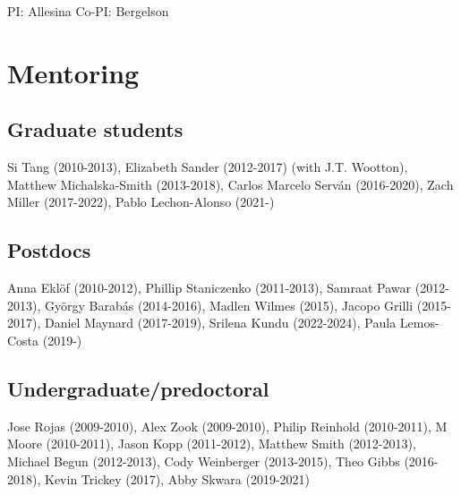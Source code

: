 \documentclass[10,letter,]{awesome-cv}
\begin{document}
\begin{cventries}
{\begin{cvitems}
\item PI: Allesina Co-PI: Bergelson
\end{cvitems}}
\end{cventries}

\hypertarget{mentoring}{%
\section{Mentoring}\label{mentoring}}

\hypertarget{graduate-students}{%
\subsection{Graduate students}\label{graduate-students}}

Si Tang (2010-2013), Elizabeth Sander (2012-2017) (with J.T. Wootton),
Matthew Michalska-Smith (2013-2018), Carlos Marcelo Serván (2016-2020),
Zach Miller (2017-2022), Pablo Lechon-Alonso (2021-)

\hypertarget{postdocs}{%
\subsection{Postdocs}\label{postdocs}}

Anna Eklöf (2010-2012), Phillip Staniczenko (2011-2013), Samraat Pawar
(2012-2013), György Barabás (2014-2016), Madlen Wilmes (2015), Jacopo
Grilli (2015-2017), Daniel Maynard (2017-2019), Srilena Kundu
(2022-2024), Paula Lemos-Costa (2019-)

\hypertarget{undergraduatepredoctoral}{%
\subsection{Undergraduate/predoctoral}\label{undergraduatepredoctoral}}

Jose Rojas (2009-2010), Alex Zook (2009-2010), Philip Reinhold
(2010-2011), M Moore (2010-2011), Jason Kopp (2011-2012), Matthew Smith
(2012-2013), Michael Begun (2012-2013), Cody Weinberger (2013-2015),
Theo Gibbs (2016-2018), Kevin Trickey (2017), Abby Skwara (2019-2021)
\end{document}
